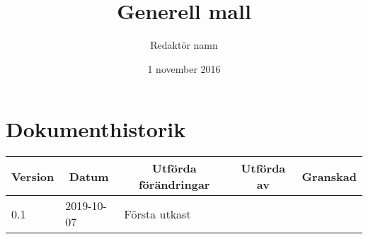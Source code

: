 \documentclass[10pt,oneside,swedish]{lips_no-customer}
\title{Generell mall}
\author{Redaktör namn}
\date{1 november 2016}
\begin{document}
\maketitle

\cleardoublepage
\makeprojectid

\cleardoublepage
\tableofcontents

\cleardoublepage
\section*{Dokumenthistorik}
\begin{tabular}{p{}|p{}|p{}|p{}|p{}} 
  \multicolumn{1}{c}{\bfseries Version} & 
  \multicolumn{1}{|c}{\bfseries Datum} & 
  \multicolumn{1}{|c}{\bfseries Utförda förändringar} & 
  \multicolumn{1}{|c}{\bfseries Utförda av} & 
  \multicolumn{1}{|c}{\bfseries Granskad}\\
  \hline
  \hline
  0.1 & 2019-10-07 & Första utkast & & \\
  \hline
\end{tabular}

\cleardoublepage
{}\cfoot{\thepage}





\end{document}
